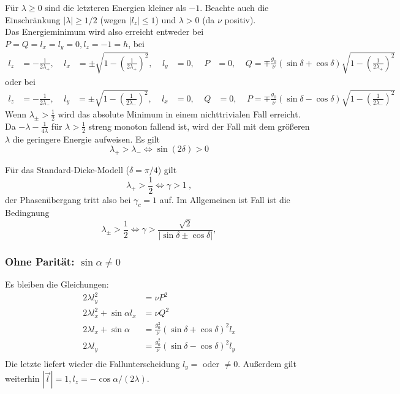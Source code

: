 Für $\lambda \geq 0$ sind die letzteren Energien kleiner als $-1$. 
Beachte auch die Einschränkung $|\lambda|\geq 1/2$ (wegen $|l_z|\leq 1$) und $\lambda > 0$ (da $\nu$ positiv).\\
Das Energieminimum wird also erreicht entweder bei \\
$P=Q=l_x=l_y=0, l_z = -1 = h$, bei 
\begin{align*}
  l_z & =-\frac{1}{2\lambda_+},~~~~~l_{x} &= \pm \sqrt{1-(\frac{1}{2\lambda_+})^2},~~~~~l_{y} &= 0 ,~~~~~ P&=0,~~~~~Q=\mp \frac{g_0}{\nu}(\sin\delta + \cos\delta) \sqrt{1-(\frac{1}{2\lambda_+})^2} 
\end{align*}
oder bei
\begin{align*}
  l_z & =-\frac{1}{2\lambda_-},~~~~~l_{y} &= \pm \sqrt{1-(\frac{1}{2\lambda_-})^2},~~~~~l_{x} &= 0, ~~~~~ Q&=0,~~~~~P= \mp \frac{g_0}{\nu}(\sin\delta - \cos\delta) \sqrt{1-(\frac{1}{2\lambda_-})^2} 
\end{align*}
Wenn $\lambda_\pm>\frac12$ wird das absolute Minimum in einem nichttrivialen Fall erreicht.
Da $-\lambda -\frac{1}{4\lambda}$ für $\lambda>\frac{1}{2}$ streng monoton fallend ist, wird der Fall mit dem größeren $\lambda$ die geringere Energie aufweisen.
Es gilt 
\begin{equation}
 \lambda_+ > \lambda_- \Leftrightarrow \sin(2\delta)>0
\end{equation}


Für das Standard-Dicke-Modell ($\delta = \pi/4$) gilt
\begin{equation}
 \lambda_+>\frac{1}{2} \Leftrightarrow \gamma>1~,
\end{equation}
der Phasenübergang tritt also bei $\gamma_c=1$ auf.
Im Allgemeinen ist Fall ist die Bedingnung
\begin{equation}
 \lambda_\pm > \frac{1}{2} \Leftrightarrow \gamma>\frac{\sqrt{2}}{|\sin\delta \pm\cos\delta|},
\end{equation}


\subsubsection{ Ohne Parität: $\sin\alpha \neq 0$}
Es bleiben die Gleichungen:
\begin{align}
  2\lambda l_y^2 &= \nu P^2 \nonumber\\
  2\lambda l_x^2 + \sin\alpha l_x  &= \nu Q^2\nonumber\\ 
  2\lambda l_x + \sin\alpha&= \frac{g_0^2}{\nu}(\sin\delta + \cos\delta)^2 l_x\label{Gleichung fuer lx}\\
  2\lambda l_y &= \frac{g_0^2}{\nu}(\sin\delta - \cos\delta)^2 l_y\nonumber\\
\end{align}
Die letzte liefert wieder die Fallunterscheidung $l_y =$ oder $\neq 0$. Außerdem gilt weiterhin $|\vec{l}|=1, l_z = -\cos\alpha/(2\lambda)$.
\\ 
\\

